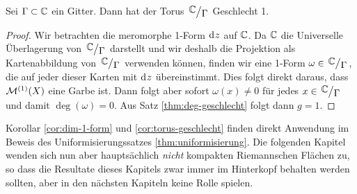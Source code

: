 \begin{cor}
  \label{cor:torus-geschlecht}
  Sei $\Gamma \subset \mathbb{C}$ ein Gitter. Dann hat der Torus
  $\quot{\C}{\Gamma}$ Geschlecht 1.
\end{cor}

\begin{proof}
  Wir betrachten die meromorphe 1-Form $\d[z]$ auf $\mathbb{C}$. Da $\mathbb{C}$ die
  Universelle Überlagerung von $\quot{\C}{\Gamma}$ darstellt und wir
  deshalb die Projektion als Kartenabbildung von $\quot{\C}{\Gamma}$
  verwenden können, finden wir eine 1-Form $\omega \in
  \quot{\C}{\Gamma}$, die auf jeder dieser Karten mit $\d[z]$
  übereinstimmt. Dies folgt direkt daraus, dass $\mathcal{M}^{(1)}(X)$ eine
  Garbe ist. Dann folgt aber sofort $\omega(x) \neq 0$ für jedes $x
  \in \quot{\C}{\Gamma}$ und damit $\deg(\omega) = 0$. Aus Satz
  \ref{thm:deg-geschlecht} folgt dann $g = 1$.
\end{proof}


Korollar \ref{cor:dim-1-form} und \ref{cor:torus-geschlecht} finden
direkt Anwendung im Beweis des Uniformisierungssatzes
\ref{thm:uniformisierung}. Die folgenden Kapitel wenden sich nun aber
hauptsächlich \emph{nicht} kompakten Riemannschen Flächen zu, so dass
die Resultate dieses Kapitels zwar immer im Hinterkopf behalten werden
sollten, aber in den nächsten Kapiteln keine Rolle spielen.


